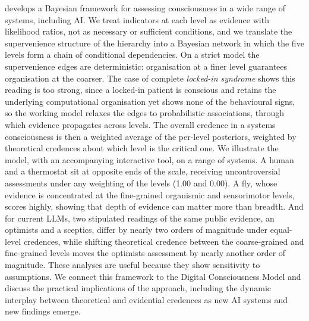 \documentclass[11pt, a4paper, onecolumn, gdm]{google}
\newcounter{none}
\begin{document}
 develops a Bayesian framework for assessing consciousness in a wide range of systems, including AI.
We treat indicators at each level as evidence with likelihood ratios, not as necessary or sufficient conditions, and we translate the supervenience structure of the hierarchy into a Bayesian network in which the five levels form a chain of conditional dependencies.
On a strict model the supervenience edges are deterministic: organisation at a finer level guarantees organisation at the coarser.
The case of complete \emph{locked-in syndrome} shows this reading is too strong, since a locked-in patient is conscious and retains the underlying computational organisation yet shows none of the behavioural signs, so the working model relaxes the edges to probabilistic associations, through which evidence propagates across levels.
The overall credence in a system\textquotesingle s consciousness is then a weighted average of the per-level posteriors, weighted by theoretical credences about which level is the critical one.
We illustrate the model, with an accompanying interactive tool, on a range of systems.
A human and a thermostat sit at opposite ends of the scale, receiving uncontroversial assessments under any weighting of the levels (1.00 and 0.00).
A fly, whose evidence is concentrated at the fine-grained organismic and sensorimotor levels, scores highly, showing that depth of evidence can matter more than breadth.
And for current LLMs, two stipulated readings of the same public evidence, an optimist\textquotesingle s and a sceptic\textquotesingle s, differ by nearly two orders of magnitude under equal-level credences, while shifting theoretical credence between the coarse-grained and fine-grained levels moves the optimist\textquotesingle s assessment by nearly another order of magnitude. 
These analyses are useful because they show sensitivity to assumptions.
We connect this framework to the Digital Consciousness Model  and discuss the practical implications of the approach, including the dynamic interplay between theoretical and evidential credences as new AI systems and new findings emerge.
\end{document}
